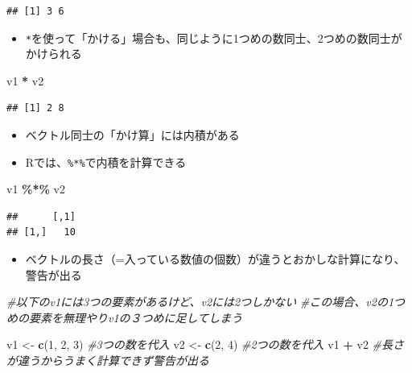 \documentclass[
]{book}
\newenvironment{Shaded}{\begin{snugshade}}{\end{snugshade}}
\newcommand{\CommentTok}[1]{\textcolor[rgb]{0.56,0.35,0.01}{\textit{#1}}}
\newcommand{\DecValTok}[1]{\textcolor[rgb]{0.00,0.00,0.81}{#1}}
\newcommand{\FunctionTok}[1]{\textcolor[rgb]{0.13,0.29,0.53}{\textbf{#1}}}
\newcommand{\NormalTok}[1]{#1}
\newcommand{\OtherTok}[1]{\textcolor[rgb]{0.56,0.35,0.01}{#1}}
\newcommand{\SpecialCharTok}[1]{\textcolor[rgb]{0.81,0.36,0.00}{\textbf{#1}}}
\providecommand{\tightlist}{%
  \setlength{\itemsep}{0pt}\setlength{\parskip}{0pt}}
\begin{document}
\begin{verbatim}
## [1] 3 6
\end{verbatim}

\begin{itemize}
\tightlist
\item
  \texttt{*}を使って「かける」場合も、同じように1つめの数同士、2つめの数同士がかけられる
\end{itemize}

\begin{Shaded}
\begin{Highlighting}[]
\NormalTok{v1 }\SpecialCharTok{*}\NormalTok{ v2}
\end{Highlighting}
\end{Shaded}

\begin{verbatim}
## [1] 2 8
\end{verbatim}

\begin{itemize}
\tightlist
\item
  ベクトル同士の「かけ算」には内積がある
\item
  Rでは、\texttt{\%*\%}で内積を計算できる
\end{itemize}

\begin{Shaded}
\begin{Highlighting}[]
\NormalTok{v1 }\SpecialCharTok{\%*\%}\NormalTok{ v2 }
\end{Highlighting}
\end{Shaded}

\begin{verbatim}
##      [,1]
## [1,]   10
\end{verbatim}

\begin{itemize}
\tightlist
\item
  ベクトルの長さ（=入っている数値の個数）が違うとおかしな計算になり、警告が出る
\end{itemize}

\begin{Shaded}
\begin{Highlighting}[]
\CommentTok{\#以下のv1には3つの要素があるけど、v2には2つしかない}
\CommentTok{\#この場合、v2の1つめの要素を無理やりv1の３つめに足してしまう}

\NormalTok{v1 }\OtherTok{\textless{}{-}} \FunctionTok{c}\NormalTok{(}\DecValTok{1}\NormalTok{, }\DecValTok{2}\NormalTok{, }\DecValTok{3}\NormalTok{)  }\CommentTok{\#3つの数を代入}
\NormalTok{v2 }\OtherTok{\textless{}{-}} \FunctionTok{c}\NormalTok{(}\DecValTok{2}\NormalTok{, }\DecValTok{4}\NormalTok{) }\CommentTok{\#2つの数を代入}
\NormalTok{v1 }\SpecialCharTok{+}\NormalTok{ v2 }\CommentTok{\#長さが違うからうまく計算できず警告が出る}
\end{Highlighting}
\end{Shaded}
\end{document}
